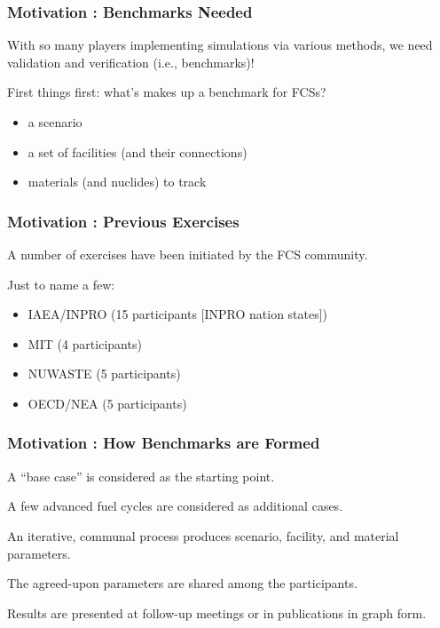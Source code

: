 
\begin{frame}[ctb!]
  \frametitle{Motivation : Benchmarks Needed} 
  With so many players implementing simulations via various methods, we need 
  validation and verification (i.e., benchmarks)!

  \vspace{0.4cm}

  First things first: what's makes up a benchmark for FCSs?

  \begin{itemize}
    \item a scenario
    \item a set of facilities (and their connections)
    \item materials (and nuclides) to track
  \end{itemize}
\end{frame}

\begin{frame}[ctb!]
  \frametitle{Motivation : Previous Exercises}
  A number of exercises have been initiated by the FCS community.

  \vspace{0.4cm}

  Just to name a few:
  \begin{itemize}
    \item IAEA/INPRO (15 participants [INPRO nation states])\cite{_international_2011}
    \item MIT (4 participants) \cite{guerin_benchmark_2009}
    \item NUWASTE (5 participants) \cite{abkowitz_workshop_2011}
    \item OECD/NEA (5 participants) \cite{boucher_benchmark_2012}
  \end{itemize}
\end{frame}

\begin{frame}[ctb!]
  \frametitle{Motivation : How Benchmarks are Formed}
  A ``base case'' is considered as the starting point.

  \vspace{0.4cm}

  A few advanced fuel cycles are considered as additional cases.

  \vspace{0.4cm}

  An iterative, communal process produces scenario, facility, and material
  parameters.

  \vspace{0.4cm}

  The agreed-upon parameters are shared among the participants.

  \vspace{0.4cm}

  Results are presented at follow-up meetings or in publications in graph form.
\end{frame}

